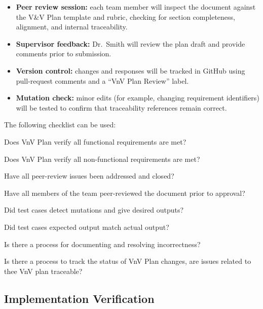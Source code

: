 \documentclass[12pt, titlepage]{article}
\begin{document}
\begin{itemize}
  \item \textbf{Peer review session:} each team member will inspect the document
  against the V\&V Plan template and rubric, checking for section completeness,
  alignment, and internal traceability.

  \item \textbf{Supervisor feedback:} Dr.~Smith will review the plan draft and
  provide comments prior to submission.

  \item \textbf{Version control:} changes and responses will be tracked in
  GitHub using pull-request comments and a ``VnV Plan Review'' label.

  \item \textbf{Mutation check:} minor edits (for example, changing requirement
  identifiers) will be tested to confirm that traceability references remain
  correct.
\end{itemize}

The following checklist can be used:
\begin{todolist}
  \item Does VnV Plan verify all functional requirements are met?
  \item Does VnV Plan verify all non-functional requirements are met?
  \item Have all peer-review issues been addressed and closed?
  \item Have all members of the team peer-reviewed the document prior to approval?
  \item Did test cases detect mutations and give desired outputs?
  \item Did test cases expected output match actual output?
  \item Is there a process for documenting and resolving incorrectness?
  \item Is there a process to track the status of VnV Plan changes, are issues related to thee VnV plan traceable?
\end{todolist}

\subsection{Implementation Verification}
\label{subsec:implementation-verification}

\end{document}

